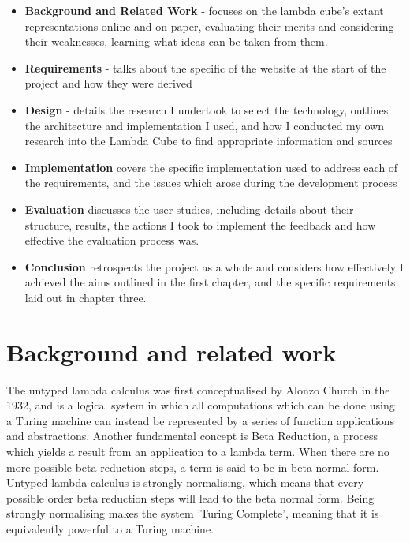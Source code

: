 \documentclass{l4proj}
\begin{document}
\begin{itemize}
    \item
    \textbf{Background and Related Work} - focuses on the lambda cube's extant representations online and on paper,  evaluating their merits and considering their weaknesses, learning what ideas can be taken from them.
    \item
    \textbf{Requirements} - talks about the specific  of the website at the start of the project and how they were derived
    \item
    \textbf{Design} - details the research I undertook to select the technology, outlines the architecture and implementation I used, and how I conducted my own research into the Lambda Cube to find appropriate information and sources
    \item
    \textbf{Implementation} covers the specific implementation used to address each of the requirements, and the issues which arose during the development process
    \item
    \textbf{Evaluation} discusses the user studies, including details about their structure, results, the actions I took to implement the feedback and how effective the evaluation process was.
    \item
    \textbf{Conclusion} retrospects the project as a whole and considers how effectively I achieved the aims outlined in the first chapter, and the specific requirements laid out in chapter three.
    
\end{itemize}

\chapter{Background and related work}

The untyped lambda calculus was first conceptualised by Alonzo Church in the 1932, and is a logical system in which all computations which can be done using a Turing machine can instead be represented by a series of function applications and abstractions.  Another fundamental concept is Beta Reduction, a process which yields a result from an application to a lambda term.  When there are no more possible beta reduction steps, a term is said to be in beta normal form.  Untyped lambda calculus is strongly normalising, which means that every possible order beta reduction steps will lead to the beta normal form.  Being strongly normalising makes the system 'Turing Complete', meaning that it is equivalently powerful to a Turing machine.
\end{document}
